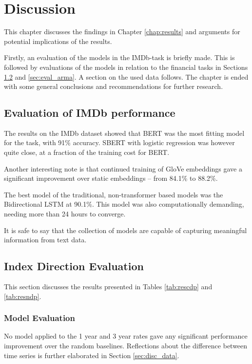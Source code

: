 \chapter{Discussion}

This chapter discusses the findings in Chapter \ref{chap:results} and arguments for potential implications of the results. 

Firstly, an evaluation of the models in the IMDb-task is briefly made. This is followed by evaluations of the models in relation to the financial tasks in Sections \ref{sec:eval_index} and \ref{sec:eval_arma}. A section on the used data follows. The chapter is ended with some general conclusions and recommendations for further research. 

\section{Evaluation of IMDb performance}

The results on the IMDb dataset showed that BERT was the most fitting model for the task, with 91\% accuracy. SBERT with logistic regression was however quite close, at a fraction of the training cost for BERT.

Another interesting note is that continued training of GloVe embeddings gave a significant improvement over static embeddings -- from 84.1\% to 88.2\%. 

The best model of the traditional, non-transformer based models was the Bidirectional LSTM at 90.1\%. This model was also computationally demanding, needing more than 24 hours to converge. 

It is safe to say that the collection of models are capable of capturing meaningful information from text data.

\section{Index Direction Evaluation}\label{sec:eval_index}

This section discusses the results presented in Tables \ref{tab:rescdp} and \ref{tab:resndp}.

\subsection{Model Evaluation}

No model applied to the 1 year and 3 year rates gave any significant performance improvement over the random baselines. Reflections about the difference between time series is further elaborated in Section \ref{sec:disc_data}. 


